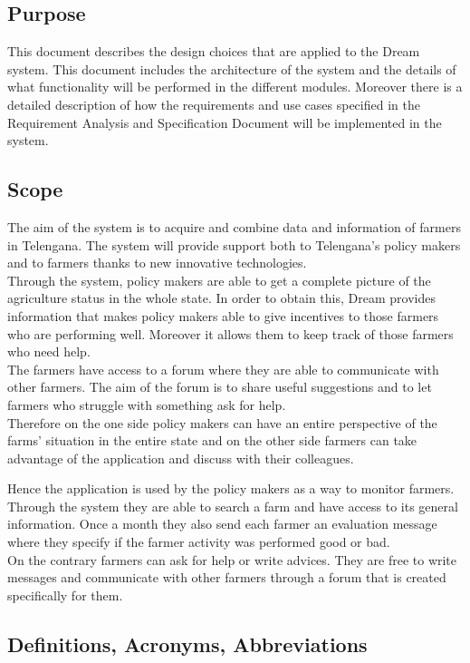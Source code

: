 \subsection{Purpose}
This document describes the design choices that are applied to the Dream system.
This document includes the architecture of the system and the details of what functionality will be performed in the different modules. 
Moreover there is a detailed description of how the requirements and use cases specified in the 
Requirement Analysis and Specification Document will be implemented in the system.
\subsection{Scope}
The aim of the system is to acquire and combine data and information of farmers in Telengana. 
The system will provide support both to Telengana’s policy makers and to farmers 
thanks to new innovative technologies.\\
Through the system, policy makers are able 
to get a complete picture of the agriculture status in the whole state. In order 
to obtain this, Dream provides information that makes policy makers able to give 
incentives to those farmers who are performing well. Moreover it allows them to 
keep track of those farmers who need help. \\
The farmers have access to a forum where they are able to communicate with other 
farmers. The aim of the forum is to share useful suggestions and to let farmers 
who struggle with something ask for help. \\
Therefore on the one side policy makers can have an entire perspective of the farms’ 
situation in the entire state and on the other side farmers can take advantage of the 
application and discuss with their colleagues.
\par 
Hence the application is used by the policy makers as a way to monitor farmers. 
Through the system they are able to search a farm and have access to its general information. 
Once a month they also send each farmer an evaluation message where they specify if the farmer activity was
performed good or bad.\\
On the contrary farmers can ask for help or write advices. They are free to write messages and communicate with other farmers through a forum 
that is created specifically for them.
\subsection{Definitions, Acronyms, Abbreviations}
